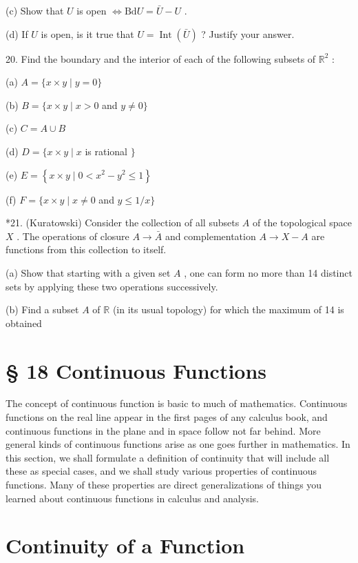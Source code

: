 (c) Show that \(U\) is open \(\Leftrightarrow  \mathrm{{Bd}}U = \bar{U} - U\) .

(d) If \(U\) is open, is it true that \(U = \operatorname{Int}\left( \bar{U}\right)\) ? Justify your answer.

20. Find the boundary and the interior of each of the following subsets of \({\mathbb{R}}^{2}\) :

(a) \(A = \{ x \times  y \mid  y = 0\}\)

(b) \(B = \{ x \times  y \mid  x > 0\) and \(y \neq  0\}\)

(c) \(C = A \cup  B\)

(d) \(D = \{ x \times  y \mid  x\) is rational \(\}\)

(e) \(E = \left\{  {x \times  y \mid  0 < {x}^{2} - {y}^{2} \leq  1}\right\}\)

(f) \(F = \{ x \times  y \mid  x \neq  0\) and \(y \leq  1/x\}\)

*21. (Kuratowski) Consider the collection of all subsets \(A\) of the topological space \(X\) . The operations of closure \(A \rightarrow  \bar{A}\) and complementation \(A \rightarrow  X - A\) are functions from this collection to itself.

(a) Show that starting with a given set \(A\) , one can form no more than 14 distinct sets by applying these two operations successively.

(b) Find a subset \(A\) of \(\mathbb{R}\) (in its usual topology) for which the maximum of 14 is obtained

\section*{§ 18 Continuous Functions}

The concept of continuous function is basic to much of mathematics. Continuous functions on the real line appear in the first pages of any calculus book, and continuous functions in the plane and in space follow not far behind. More general kinds of continuous functions arise as one goes further in mathematics. In this section, we shall formulate a definition of continuity that will include all these as special cases, and we shall study various properties of continuous functions. Many of these properties are direct generalizations of things you learned about continuous functions in calculus and analysis.

\section*{Continuity of a Function}

